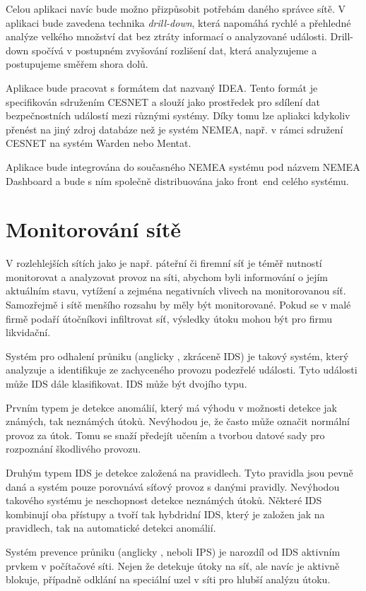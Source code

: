 Celou aplikaci navíc bude možno přizpůsobit potřebám daného správce sítě. V aplikaci bude zavedena technika {\it drill-down}, která napomáhá rychlé a přehledné analýze velkého množství dat bez ztráty informací o analyzované události. Drill-down spočívá v postupném zvyšování rozlišení dat, která analyzujeme a postupujeme směřem shora dolů.

Aplikace bude pracovat s formátem dat nazvaný IDEA. Tento formát je specifikován sdružením CESNET a slouží jako prostředek pro sdílení dat bezpečnostních událostí mezi různými systémy. Díky tomu lze apliakci kdykoliv přenést na jiný zdroj databáze než je systém NEMEA, např. v rámci sdružení CESNET na systém Warden nebo Mentat.

Aplikace bude integrována do současného NEMEA systému pod názvem NEMEA Dashboard a bude s ním společně distribuována jako front~end celého systému.

\chapter{Monitorování sítě}

V rozlehlejších sítích jako je např. páteřní či firemní síť je téměř nutností monitorovat a analyzovat provoz na síti, abychom byli informování o jejím aktuálním stavu, vytížení a zejména negativních vlivech na monitorovanou síť. Samozřejmě i sítě menšího rozsahu by měly být monitorované. Pokud se v malé firmě podaří útočníkovi infiltrovat síť, výsledky útoku mohou být pro firmu likvidační.

Systém pro odhalení průniku (anglicky , zkráceně IDS)\cite{idsips} je takový systém, který analyzuje a identifikuje ze zachyceného provozu podezřelé události. Tyto události může IDS dále klasifikovat. IDS může být dvojího typu. 

Prvním typem je detekce anomálií, který má výhodu v možnosti detekce jak známých, tak neznámých útoků. Nevýhodou je, že často může označit normální provoz za útok. Tomu se snaží předejít učením a tvorbou datové sady pro rozpoznání škodlivého provozu.

Druhým typem IDS je detekce založená na pravidlech. Tyto pravidla jsou pevně daná a systém pouze porovnává síťový provoz s danými pravidly. Nevýhodou takového systému je neschopnost detekce neznámých útoků. Některé IDS kombinují oba přístupy a tvoří tak hybdridní IDS, který je založen jak na pravidlech, tak na automatické detekci anomálií.

Systém prevence průniku (anglicky , neboli IPS)\cite{idsips} je narozdíl od IDS aktivním prvkem v počítačové síti. Nejen že detekuje útoky na síť, ale navíc je aktivně blokuje, případně odklání na speciální uzel v síti pro hlubší analýzu útoku.


